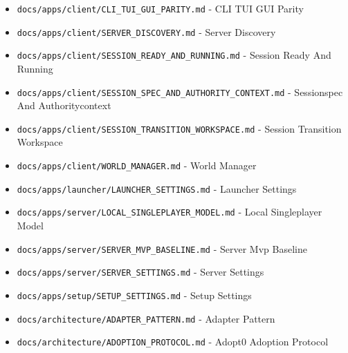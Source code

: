 \documentclass[10.5pt,a4paper,openany]{book}
\begin{document}
\begin{itemize}
\item \texttt{docs/\allowbreak{}apps/\allowbreak{}client/\allowbreak{}CLI\_\allowbreak{}TUI\_\allowbreak{}GUI\_\allowbreak{}PARITY.\allowbreak{}md} -\allowbreak{} CLI TUI GUI Parity
\item \texttt{docs/\allowbreak{}apps/\allowbreak{}client/\allowbreak{}SERVER\_\allowbreak{}DISCOVERY.\allowbreak{}md} -\allowbreak{} Server Discovery
\item \texttt{docs/\allowbreak{}apps/\allowbreak{}client/\allowbreak{}SESSION\_\allowbreak{}READY\_\allowbreak{}AND\_\allowbreak{}RUNNING.\allowbreak{}md} -\allowbreak{} Session Ready And Running
\item \texttt{docs/\allowbreak{}apps/\allowbreak{}client/\allowbreak{}SESSION\_\allowbreak{}SPEC\_\allowbreak{}AND\_\allowbreak{}AUTHORITY\_\allowbreak{}CONTEXT.\allowbreak{}md} -\allowbreak{} Sessionspec And Authoritycontext
\item \texttt{docs/\allowbreak{}apps/\allowbreak{}client/\allowbreak{}SESSION\_\allowbreak{}TRANSITION\_\allowbreak{}WORKSPACE.\allowbreak{}md} -\allowbreak{} Session Transition Workspace
\item \texttt{docs/\allowbreak{}apps/\allowbreak{}client/\allowbreak{}WORLD\_\allowbreak{}MANAGER.\allowbreak{}md} -\allowbreak{} World Manager
\item \texttt{docs/\allowbreak{}apps/\allowbreak{}launcher/\allowbreak{}LAUNCHER\_\allowbreak{}SETTINGS.\allowbreak{}md} -\allowbreak{} Launcher Settings
\item \texttt{docs/\allowbreak{}apps/\allowbreak{}server/\allowbreak{}LOCAL\_\allowbreak{}SINGLEPLAYER\_\allowbreak{}MODEL.\allowbreak{}md} -\allowbreak{} Local Singleplayer Model
\item \texttt{docs/\allowbreak{}apps/\allowbreak{}server/\allowbreak{}SERVER\_\allowbreak{}MVP\_\allowbreak{}BASELINE.\allowbreak{}md} -\allowbreak{} Server Mvp Baseline
\item \texttt{docs/\allowbreak{}apps/\allowbreak{}server/\allowbreak{}SERVER\_\allowbreak{}SETTINGS.\allowbreak{}md} -\allowbreak{} Server Settings
\item \texttt{docs/\allowbreak{}apps/\allowbreak{}setup/\allowbreak{}SETUP\_\allowbreak{}SETTINGS.\allowbreak{}md} -\allowbreak{} Setup Settings
\item \texttt{docs/\allowbreak{}architecture/\allowbreak{}ADAPTER\_\allowbreak{}PATTERN.\allowbreak{}md} -\allowbreak{} Adapter Pattern
\item \texttt{docs/\allowbreak{}architecture/\allowbreak{}ADOPTION\_\allowbreak{}PROTOCOL.\allowbreak{}md} -\allowbreak{} Adopt0 Adoption Protocol

\end{itemize}
\end{document}
